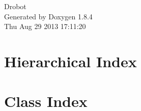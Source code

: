 \documentclass[twoside]{book}
\newcommand{\clearemptydoublepage}{%
  \newpage{\pagestyle{empty}\cleardoublepage}%
}
\begin{document}
\hypersetup{pageanchor=false}
\begin{titlepage}
\vspace*{7cm}
\begin{center}%
{\Large Drobot }\\
\vspace*{1cm}
{\large Generated by Doxygen 1.8.4}\\
\vspace*{0.5cm}
{\small Thu Aug 29 2013 17:11:20}\\
\end{center}
\end{titlepage}
\clearemptydoublepage
\tableofcontents
\clearemptydoublepage
{}
\hypersetup{pageanchor=true}

\chapter{Hierarchical Index}

\chapter{Class Index}

\end{document}

